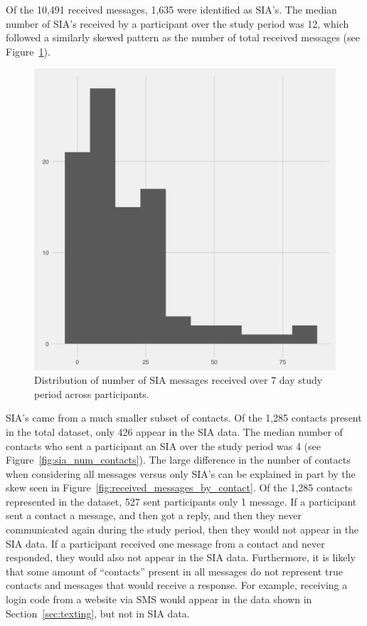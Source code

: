 \documentclass[12pt]{nuthesis}	%
\begin{document}
Of the 10,491 received messages, 1,635 were identified as SIA's. The median number of SIA's received by a participant over the study period was 12, which followed a similarly skewed pattern as the number of total received messages (see Figure~\ref{fig:received_sia_messages}).

\begin{figure}[h]
\centering
\includegraphics[width=.7\textwidth]{figures/sia_received_distribution}
\caption{Distribution of number of SIA messages received over 7 day study period across participants.}
\label{fig:received_sia_messages}
\end{figure}

SIA's came from a much smaller subset of contacts. Of the 1,285 contacts present in the total dataset, only 426 appear in the SIA data. The median number of contacts who sent a participant an SIA over the study period was 4 (see Figure~\ref{fig:sia_num_contacts}). The large difference in the number of contacts when considering all messages versus only SIA's can be explained in part by the skew seen in Figure~\ref{fig:received_messages_by_contact}. Of the 1,285 contacts represented in the dataset, 527 sent participants only 1 message. If a participant sent a contact a message, and then got a reply, and then they never communicated again during the study period, then they would not appear in the SIA data. If a participant received one message from a contact and never responded, they would also not appear in the SIA data. Furthermore, it is likely that some amount of ``contacts'' present in all messages do not represent true contacts and messages that would receive a response. For example, receiving a login code from a website via SMS would appear in the data shown in Section~\ref{sec:texting}, but not in SIA data.
\end{document}
